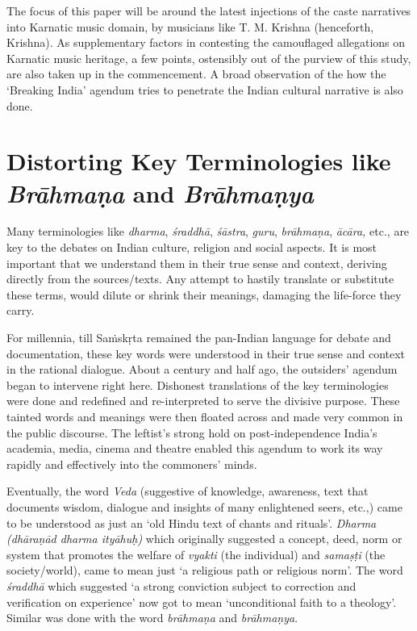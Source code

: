 The focus of this paper will be around the latest injections of the caste narratives into Karnatic music domain, by musicians like T. M. Krishna (henceforth, Krishna). As supplementary factors in contesting the camouflaged allegations on Karnatic music heritage, a few points, ostensibly out of the purview of this study, are also taken up in the commencement. A broad observation of the how the ‘Breaking India’ agendum tries to penetrate the Indian cultural narrative is also done.

\vspace{-.4cm}

\section*{Distorting Key Terminologies like \textit{Brāhmaṇa} and \textit{Brāhmaṇya}}

Many terminologies like \textit{dharma}, \textit{śraddhā}, \textit{śāstra}, \textit{guru}, \textit{brāhmaṇa}, \textit{ācāra,} etc., are key to the debates on Indian culture, religion and social aspects. It is most important that we understand them in their true sense and context, deriving directly from the sources/texts. Any attempt to hastily translate or substitute these terms, would dilute or shrink their meanings, damaging the life-force they carry.

For millennia, till Saṁskṛta remained the pan-Indian language for debate and documentation, these key words were understood in their true sense and context in the rational dialogue. About a century and half ago, the outsiders’ agendum began to intervene right here. Dishonest translations of the key terminologies were done and redefined and re-interpreted to serve the divisive purpose. These tainted words and meanings were then floated across and made very common in the public discourse. The leftist’s strong hold on post-independence India’s academia, media, cinema and theatre enabled this agendum to work its way rapidly and effectively into the commoners’ minds.

Eventually, the word \textit{Veda} (suggestive of knowledge, awareness, text that documents wisdom, dialogue and insights of many enlightened seers, etc.,) came to be understood as just an ‘old Hindu text of chants and rituals’. \textit{Dharma (dhāraṇād dharma ityāhuḥ)} which originally suggested a concept, deed, norm or system that promotes the welfare of \textit{vyakti} (the individual) and \textit{samaṣṭi} (the society/world), came to mean just ‘a religious path or religious norm’. The word \textit{śraddhā} which suggested ‘a strong conviction subject to correction and verification on experience’ now got to mean ‘unconditional faith to a theology’. Similar was done with the word \textit{brāhmaṇa} and \textit{brāhmaṇya}.

